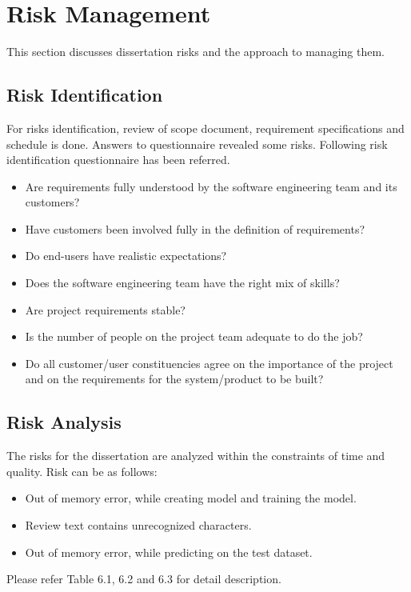 \documentclass[oneside,a4paper,12pt]{pictreport}
\begin{document}
\section{Risk Management}
This section discusses dissertation risks and the approach to managing them.
\subsection{Risk Identification}
For risks identification, review of scope document, requirement specifications and schedule is done. Answers to questionnaire revealed some risks. Following risk identification questionnaire has been referred.
\begin{itemize}
\item Are requirements fully understood by the software engineering team and its customers?
\item Have customers been involved fully in the definition of requirements?
\item Do end-users have realistic expectations?
\item Does the software engineering team have the right mix of skills?
\item Are project requirements stable?
\item Is the number of people on the project team adequate to do the job?
\item Do all customer/user constituencies agree on the importance of the project and on the requirements for the system/product to be built?
\end{itemize}

\subsection{Risk Analysis}
The risks for the dissertation are analyzed within the constraints of time and quality. Risk can be as follows:

\begin{itemize}
\item Out of memory error, while creating model and training the model.
\item Review text contains unrecognized characters.
\item Out of memory error, while predicting on the test dataset.
\end{itemize}
Please refer Table 6.1, 6.2 and 6.3 for detail description.
\end{document}
